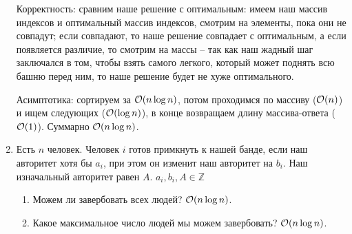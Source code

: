 \begin{enumerate}
\begin{solution}
        Корректность: сравним наше решение с оптимальным: имеем наш массив индексов и оптимальный массив индексов, смотрим на элементы, пока они не совпадут; если совпадают, то наше решение совпадает с оптимальным, а если появляется различие, то смотрим на массы -- так как наш жадный шаг заключался в том, чтобы взять самого легкого, который может поднять всю башню перед ним, то наше решение будет не хуже оптимального.

        Асимптотика: сортируем за $\mathcal{O}(n \log n)$, потом проходимся по массиву ($\mathcal{O}(n)$) и ищем следующих ($\mathcal{O}(\log n)$), в конце возвращаем длину массива-ответа ($\mathcal{O}(1)$). Суммарно $\mathcal{O}(n \log n)$.
    \end{solution}

  \item
	Есть $n$ человек. Человек $i$ готов примкнуть к нашей банде, если наш авторитет
	хотя бы $a_i$, при этом он изменит наш авторитет на $b_i$. Наш изначальный авторитет
	равен $A$. $a_i, b_i, A \in \mathbb{Z}$
	\begin{enumerate}
		\item Можем ли завербовать всех людей? $\mathcal{O}(n \log n)$.
		\item Какое максимальное число людей мы можем завербовать? $\mathcal{O}(n \log n)$.
	\end{enumerate}






\end{enumerate}
